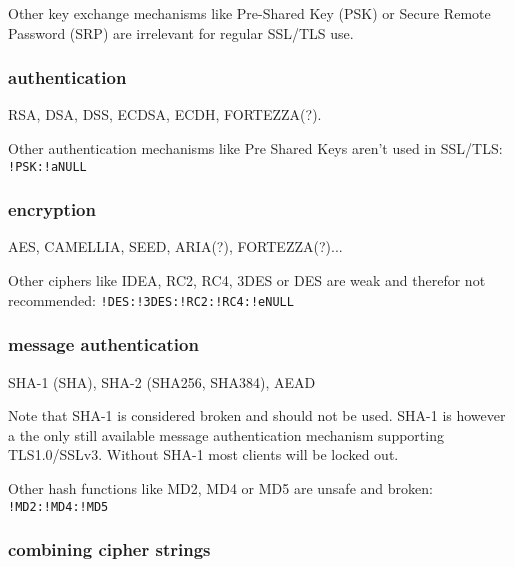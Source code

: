 Other key exchange mechanisms like Pre-Shared Key (PSK) or Secure Remote Password
(SRP) are irrelevant for regular SSL/TLS use.

\subsubsection{authentication}

RSA, DSA, DSS, ECDSA, ECDH, FORTEZZA(?).

Other authentication mechanisms like Pre Shared Keys aren't used in SSL/TLS: \texttt{!PSK:!aNULL}

\subsubsection{encryption}

AES, CAMELLIA, SEED, ARIA(?), FORTEZZA(?)...

Other ciphers like IDEA, RC2, RC4, 3DES or DES are weak and therefor not recommended:
\texttt{!DES:!3DES:!RC2:!RC4:!eNULL}

\subsubsection{message authentication}

SHA-1 (SHA), SHA-2 (SHA256, SHA384), AEAD

Note that SHA-1 is considered broken and should not be used. SHA-1 is however a the
only still available message authentication mechanism supporting TLS1.0/SSLv3. Without
SHA-1 most clients will be locked out.

Other hash functions like MD2, MD4 or MD5 are unsafe and broken: \texttt{!MD2:!MD4:!MD5}

\subsubsection{combining cipher strings}


